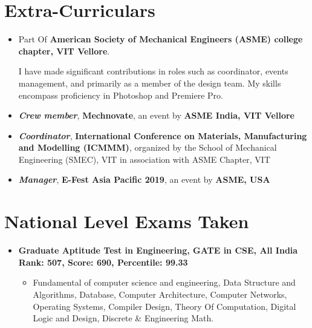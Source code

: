 \documentclass[10.8pt, a4paper]{extarticle}
\newcommand{\shorterSection}[1]{\vspace{-10pt}\section{#1}}
\begin{document}
\shorterSection{Extra-Curriculars}
\begin{itemize}
\item Part Of \textbf{American Society of Mechanical Engineers (ASME) college chapter, VIT Vellore}. \href{https://m.facebook.com/story.php?story_fbid=pfbid02PFELcj2eSP5jKHCXbLVLbEHxS8VHwkXKTn5VppoYcqn2MsAU6kcHg1noYHc1g59Yl&id=406549079357847&mibextid=Nif5oz}{\faLink{}} 

I have made significant contributions in roles such as coordinator, events management, and primarily as a member of the design team. My skills encompass proficiency in Photoshop and Premiere Pro.

\item \textit{\textbf{Crew member}}, \textbf{Mechnovate}, an event by \textbf{ASME India, VIT Vellore} \href{https://drive.google.com/file/d/1skeeRg3UISDUtRxwI7Nfen7c6zbsuysX/view?usp=sharing}{\faLink{}}

\item \textit{\textbf{Coordinator}}, \textbf{International Conference on Materials, Manufacturing and Modelling (ICMMM)}, organized by the School of Mechanical Engineering (SMEC), VIT in association with ASME Chapter, VIT \href{https://drive.google.com/file/d/1skeeRg3UISDUtRxwI7Nfen7c6zbsuysX/view?usp=sharing}{\faLink{}}

\item \textit{\textbf{Manager}}, \textbf{E-Fest Asia Pacific 2019}, an event by \textbf{ASME, USA} \href{https://drive.google.com/file/d/1skeeRg3UISDUtRxwI7Nfen7c6zbsuysX/view?usp=sharing}{\faLink{}} \href{https://efests.asme.org/gallery/images/e-fest-asia-pacific-2019}{\faLink{}}

\vspace{4mm}
\end{itemize}
\vspace{4mm}


\shorterSection{National Level Exams Taken}
\begin{itemize}
\item \textbf{Graduate Aptitude Test in Engineering, GATE in CSE, All India Rank: 507, Score: 690, Percentile: 99.33}
    \begin{itemize}
    \item Fundamental of computer science and engineering, Data Structure and Algorithms, Database, Computer Architecture, Computer Networks, Operating Systems, Compiler Design, Theory Of Computation, Digital Logic and Design, Discrete \& Engineering Math.  \href{https://drive.google.com/file/d/1IkVH0v_xUTgL83VHjq7N5oFpSjw99Zma/view?usp=drive_link}{}
    \end{itemize}
\vspace{4mm}
\end{itemize}
\vspace{4mm}
\end{document}
